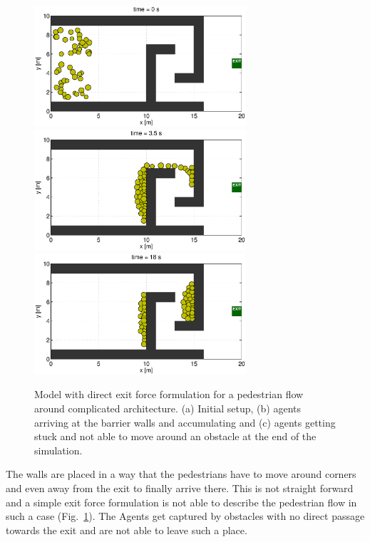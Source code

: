 \documentclass[11pt]{article}
\begin{document}
\begin{figure}
	\begin{center}
	\includegraphics[width=0.7\textwidth]
	{figures/Model2_direct_1b_000000.eps}
	\qquad
	\includegraphics[width=0.7\textwidth]
	{figures/Model2_direct_1b_000350.eps}
	\qquad
	\includegraphics[width=0.7\textwidth]
	{figures/Model2_direct_1b_001800.eps}
	\caption{Model with direct exit force formulation for a pedestrian flow around complicated architecture. (a) Initial setup, (b) agents arriving at the barrier walls and accumulating and (c) agents getting stuck and not able to move around an obstacle at the end of the simulation.}
	\label{fig:simple3}
	\end{center}
\end{figure}

The walls are placed in a way that the pedestrians have to move around corners and even away from the exit to finally arrive there. This is not straight forward and a simple exit force formulation is not able to describe the pedestrian flow in such a case (Fig.~\ref{fig:simple3}). The Agents get captured by obstacles with no direct passage towards the exit and are not able to leave such a place. 
\end{document}
